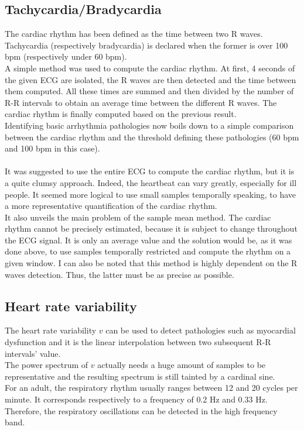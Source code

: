 \documentclass[11pt]{article}
\begin{document}
	\subsection{Tachycardia/Bradycardia}
		The cardiac rhythm has been defined as the time between two R waves. Tachycardia (respectively bradycardia) is declared when the former is over 100 bpm (respectively under 60 bpm).\\
		A simple method was used to compute the cardiac rhythm. At first, 4 seconds of the given ECG are isolated, the R waves are then detected and the time between them computed. All these times are summed and then divided by the number of R-R intervals to obtain an average time between the different R waves. The cardiac rhythm is finally computed based on the previous result. \\
		Identifying basic arrhythmia pathologies now boils down to a simple comparison between the cardiac rhythm and the threshold defining these pathologies (60 bpm and 100 bpm in this case).\\
		\\
		It was suggested to use the entire ECG to compute the cardiac rhythm, but it is a quite clumsy approach. Indeed, the heartbeat can vary greatly, especially for ill people. It seemed more logical to use small samples temporally speaking, to have a more representative quantification of the cardiac rhythm.\\
		It also unveils the main problem of the sample mean method. The cardiac rhythm cannot be precisely estimated, because it is subject to change throughout the ECG signal. It is only an average value and the solution would be, as it was done above, to use samples temporally restricted and compute the rhythm on a given window.
		I can also be noted that this method is highly dependent on the R waves detection. Thus, the latter must be as precise as possible.
	\subsection{Heart rate variability}
		The heart rate variability $v$ can be used to detect pathologies such as myocardial dysfunction and it is the linear interpolation between two subsequent R-R intervals' value.\\
		The power spectrum of $v$ actually needs a huge amount of samples to be representative and the resulting spectrum is still tainted by a cardinal sine.\\
		For an adult, the respiratory rhythm usually ranges between 12 and 20 cycles per minute. It corresponds respectively to a frequency of 0.2 Hz and 0.33 Hz. Therefore, the respiratory oscillations can be detected in the high frequency band.
\end{document}

